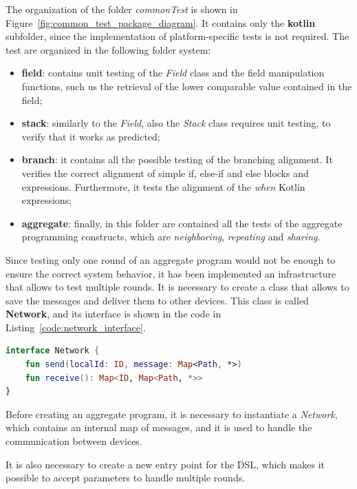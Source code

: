 The organization of the folder \textit{commonTest} is shown in Figure~\ref{fig:common_test_package_diagram}. It contains only the \textbf{kotlin} subfolder, since the implementation of platform-specific tests is not required.\newline
The test are organized in the following folder system:
\begin{itemize}
    \item \textbf{field}: contains unit testing of the \textit{Field} class and the field manipulation functions, such us the retrieval of the lower comparable value contained in the field;
    \item \textbf{stack}: similarly to the \textit{Field}, also the \textit{Stack} class requires unit testing, to verify that it works as predicted;
    \item \textbf{branch}: it contains all the possible testing of the branching alignment. It verifies the correct alignment of simple if, else-if and else blocks and expressions. Furthermore, it tests the alignment of the \textit{when} Kotlin expressions;
    \item \textbf{aggregate}: finally, in this folder are contained all the tests of the aggregate programming constructs, which are \textit{neighboring}, \textit{repeating} and \textit{sharing}.
\end{itemize}

Since testing only one round of an aggregate program would not be enough to ensure the correct system behavior, it has been implemented an infrastructure that allows to test multiple rounds.\newline
It is necessary to create a class that allows to save the messages and deliver them to other devices. This class is called \textbf{Network}, and its interface is shown in the code in Listing~\ref{code:network_interface}.
\begin{lstlisting}[caption={Network interface to simulate multiple round of an aggregate program in tests}, captionpos=b, language=Kotlin, label={code:network_interface}]
interface Network {
    fun send(localId: ID, message: Map<Path, *>)
    fun receive(): Map<ID, Map<Path, *>>
}
\end{lstlisting}
Before creating an aggregate program, it is necessary to instantiate a \textit{Network}, which contains an internal map of messages, and it is used to handle the communication between devices.

It is also necessary to create a new entry point for the DSL, which makes it possible to accept parameters to handle multiple rounds.


